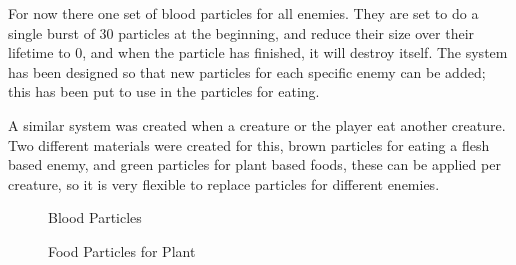 \documentclass[11pt]{report}
\begin{document}
For now there one set of blood particles for all enemies. They are set to do a single burst of 30 particles at the beginning, and reduce their size over their lifetime to 0, and when the particle has finished, it will destroy itself. The system has been designed so that new particles for each specific enemy can be added; this has been put to use in the particles for eating.

A similar system was created when a creature or the player eat another creature. Two different materials were created for this, brown particles for eating a flesh based enemy, and green particles for plant based foods, these can be applied per creature, so it is very flexible to replace particles for different enemies.

\begin{figure}[H]
    \begin{minipage}{.5\textwidth}
        \centering
        \caption{Blood Particles}
    \end{minipage}
    \begin{minipage}{.5\textwidth}
        \centering
        \caption{Food Particles for Plant}
    \end{minipage}
\end{figure}
\end{document}
